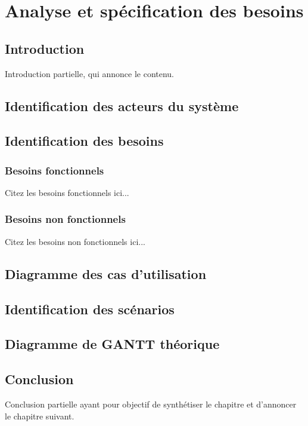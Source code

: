 \chapter{Analyse et spécification des besoins}

\section*{Introduction}
    Introduction partielle, qui annonce  le contenu.

\section{Identification des acteurs du système}

\section{Identification des besoins}
    \subsection{Besoins fonctionnels}
        Citez les besoins fonctionnels ici...
        
    \subsection{Besoins non fonctionnels}
        Citez les besoins non fonctionnels ici...
        
\section{Diagramme des cas d'utilisation}


\section{Identification des scénarios}
    
    
\section{Diagramme de GANTT théorique}
    
    
\section*{Conclusion}
    Conclusion partielle ayant pour objectif de synthétiser le chapitre et d’annoncer le chapitre suivant.